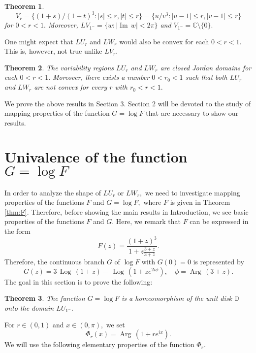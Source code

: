 \documentclass[a4paper,12pt]{amsart}
\numberwithin{equation}{section}
\newtheorem{thm}{Theorem}[section]
\theoremstyle{definition}
\begin{document}
\begin{thm}\label{thm:v}
$$
V_r=\{(1+s)/(1+t)^3: |s|\le r, |t|\le r\}
=\{u/v^3: |u-1|\le r, |v-1|\le r\}
$$
for $0<r<1.$
Moreover, $LV_{1^-}=\{w: |{{\operatorname{Im}\,}} w|<2\pi\}$ and $V_{1^-}={{\mathbb C}}\setminus\{0\}.$
\end{thm}

One might expect that $LU_r$ and $LW_r$ would also be convex for each
$0<r<1.$
This is, however, not true unlike $LV_r.$

\begin{thm}\label{thm:nonconvex}
The variability regions $LU_r$ and $LW_r$ are closed Jordan domains
for each $0<r<1.$
Moreover, there exists a number $0<r_0<1$ such that both $LU_r$ and $LW_r$
are not convex for every $r$ with $r_0<r<1.$
\end{thm}

We prove the above results in Section 3.
Section 2 will be devoted to the study of mapping properties of the function
$G=\log F$ that are necessary to show our results.

\section{Univalence of the function $G=\log F$}

In order to analyze the shape of $LU_r$ or $LW_r,$ we need to
investigate mapping properties of the functions $F$ and $G=\log F,$
where $F$ is given in Theorem \ref{thm:F}.
Therefore, before showing the main results in Introduction, we see
basic properties of the functions $F$ and $G.$
Here, we remark that $F$ can be expressed in the form
$$
F(z)=\frac{(1+z)^3}{1+z\frac{3+z}{3+\bar z}}.
$$
Therefore, the continuous branch $G$ of $\log F$ with $G(0)=0$ is
represented by
\begin{equation}\label{eq:G}
G(z)=3{{\,\operatorname{Log}\,}}(1+z)-{{\,\operatorname{Log}\,}}(1+ze^{2i\phi}),\quad \phi={{\operatorname{Arg}\,}}(3+z).
\end{equation}
The goal in this section is to prove the following:

\begin{thm}\label{thm:G}
The function $G=\log F$ is a homeomorphism of the unit disk ${{\mathbb D}}$
onto the domain $LU_{1^-}.$
\end{thm}

For $r\in(0,1)$ and $x\in(0,\pi),$ we set
$$
\Phi_r(x)={{\operatorname{Arg}\,}}(1+re^{ix}).
$$
We will use the following elementary properties of the function $\Phi_r.$
\end{document}
